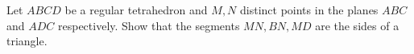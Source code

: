 Let $ABCD$ be a regular tetrahedron and $M, N$ distinct points in the planes $ABC$ and $ADC$ respectively. Show that the segments $MN, BN, MD$ are the sides of a triangle.

